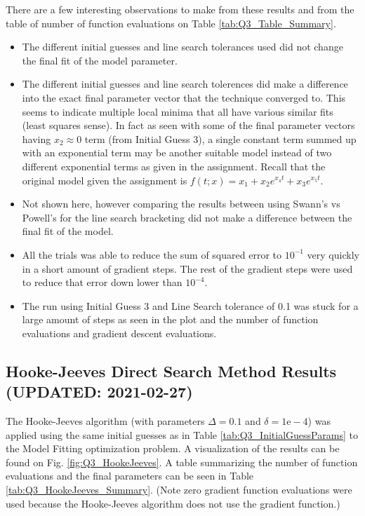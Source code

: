 \documentclass{article}
\begin{document}
    There are a few interesting observations to make from these results and from the table of number of function evaluations on Table \ref{tab:Q3_Table_Summary}.
    \begin{itemize}
        \item The different initial guesses and line search tolerances used did not change the final fit of the model parameter. 
        \item The different initial guesses and line search tolerences did make a difference into the exact final parameter vector that the technique converged to. This seems to indicate multiple local minima that all have various similar fits (least squares sense). In fact as seen with some of the final parameter vectors having $x_2 \approx 0$ term (from Initial Guess 3), a single constant term summed up with an exponential term may be another suitable model instead of two different exponential terms as given in the assignment. Recall that the original model given the assignment is $f(t; x) = x_1 + x_2 e^{x_4 t} +x_3 e^ {x_5 t}$.
        \item Not shown here, however comparing the results between using Swann's vs Powell's for the line search bracketing did not make a difference between the final fit of the model.
        \item All the trials was able to reduce the sum of squared error to $10^{-1}$ very quickly in a short amount of gradient steps. The rest of the gradient steps were used to reduce that error down lower than $10^{-4}$.
        \item The run using Initial Guess 3 and Line Search tolerance of 0.1 was stuck for a large amount of steps as seen in the plot and the number of function evaluations and gradient descent evaluations.
    \end{itemize}
    
    \subsection{Hooke-Jeeves Direct Search Method Results (UPDATED: 2021-02-27)}

    The Hooke-Jeeves algorithm (with parameters $\Delta = 0.1$ and $\delta = 1\text{e}-4$) was applied using the same initial guesses as in Table \ref{tab:Q3_InitialGuessParams} to the Model Fitting optimization problem. 
    A visualization of the results can be found on Fig. \ref{fig:Q3_HookeJeeves}. A table summarizing the number of function evaluations and the final parameters can be seen in Table \ref{tab:Q3_HookeJeeves_Summary}. (Note zero gradient function evaluations were used because the Hooke-Jeeves algorithm does not use the gradient function.)
\end{document}
